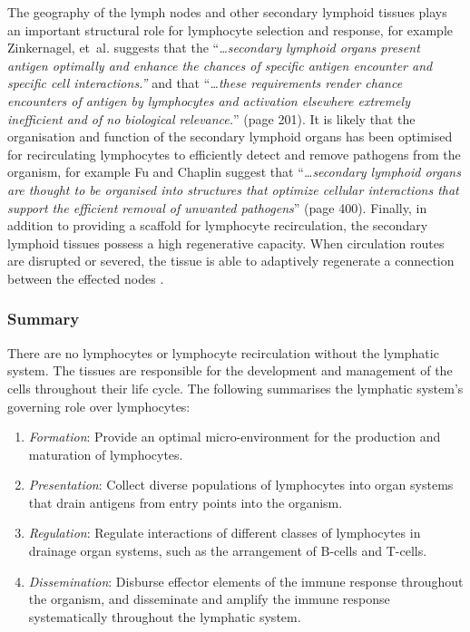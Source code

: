 The geography of the lymph nodes and other secondary lymphoid tissues plays an important structural role for lymphocyte selection and response, for example Zinkernagel, et~al. suggests that the ``\emph{\ldots secondary lymphoid organs present antigen optimally and enhance the chances of specific antigen encounter and specific cell interactions.''} and that ``\emph{\ldots these requirements render chance encounters of antigen by lymphocytes and activation elsewhere extremely inefficient and of no biological relevance.}'' \cite{Zinkernagel1997} (page 201). It is likely that the organisation and function of the secondary lymphoid organs has been optimised for recirculating lymphocytes to efficiently detect and remove pathogens from the organism, for example Fu and Chaplin suggest that ``\emph{\ldots secondary lymphoid organs are thought to be organised into structures that optimize cellular interactions that support the efficient removal of unwanted pathogens}'' \cite{Fu1999} (page 400). Finally, in addition to providing a scaffold for lymphocyte recirculation, the secondary lymphoid tissues possess a high regenerative capacity. When circulation routes are disrupted or severed, the tissue is able to adaptively regenerate a connection between the effected nodes \cite{Olszewski2003}. 

%
%
\subsubsection{Summary}
There are no lymphocytes or lymphocyte recirculation without the lymphatic system. The tissues are responsible for the development and management of the cells throughout their life cycle. The following summarises the lymphatic system's governing role over lymphocytes:

\begin{enumerate}
	\item \emph{Formation}: Provide an optimal micro-environment for the production and maturation of lymphocytes. 
	\item \emph{Presentation}: Collect diverse populations of lymphocytes into organ systems that drain antigens from entry points into the organism.
	\item \emph{Regulation}: Regulate interactions of different classes of lymphocytes in drainage organ systems, such as the arrangement of B-cells and T-cells.
	\item \emph{Dissemination}: Disburse effector elements of the immune response throughout the organism, and disseminate and amplify the immune response systematically throughout the lymphatic system.
\end{enumerate}

